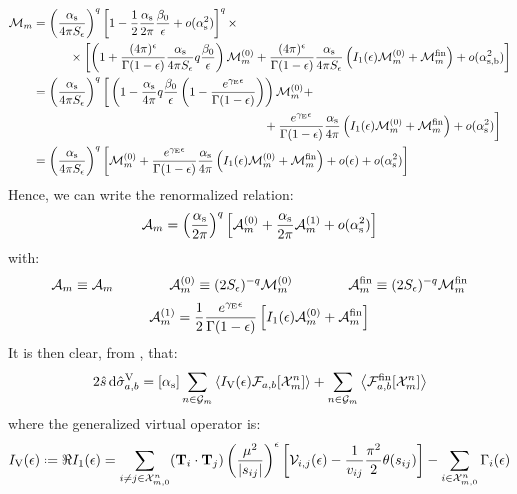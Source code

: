 \begin{equation*}
  \begin{split}
    \mathcal{M}_m
    & = \left( \frac{\alpha_\text{s}}{4\pi S_\epsilon} \right)^q \left[ 1 - \frac{1}{2} \frac{\alpha_\text{s}}{2\pi} \frac{\beta_0}{\epsilon} + o(\alpha_\text{s}^2) \right]^q \times \\
    & \qquad \quad \times \left[ \left( 1 + \frac{(4\pi)^\epsilon}{\Gamma(1-\epsilon)} \frac{\alpha_\text{s}}{4\pi S_\epsilon} q \frac{\beta_0}{\epsilon} \right) \mathcal{M}_m^{(0)} + \frac{(4\pi)^\epsilon}{\Gamma(1-\epsilon)} \frac{\alpha_\text{s}}{4\pi S_\epsilon} \left( I_1(\epsilon) \mathcal{M}_m^{(0)} + \mathcal{M}_m^\text{fin} \right) + o(\alpha_\text{s,b}^2) \right] \\
    & = \left( \frac{\alpha_\text{s}}{4\pi S_\epsilon} \right)^q \bigg[ \left( 1 - \frac{\alpha_\text{s}}{4\pi} q \frac{\beta_0}{\epsilon} \left( 1 - \frac{e^{\gamma_\text{E}\epsilon}}{\Gamma(1-\epsilon)} \right) \right) \mathcal{M}_m^{(0)} + \\
    & \qquad \qquad \qquad \qquad \qquad \qquad \qquad \qquad \qquad \quad + \frac{e^{\gamma_\text{E}\epsilon}}{\Gamma(1-\epsilon)} \frac{\alpha_\text{s}}{4\pi} \left( I_1(\epsilon) \mathcal{M}_m^{(0)} + \mathcal{M}_m^\text{fin} \right) + o(\alpha_\text{s}^2) \bigg] \\
    & = \left( \frac{\alpha_\text{s}}{4\pi S_\epsilon} \right)^q \left[ \mathcal{M}_m^{(0)} + \frac{e^{\gamma_\text{E}\epsilon}}{\Gamma(1-\epsilon)} \frac{\alpha_\text{s}}{4\pi} \left( I_1(\epsilon) \mathcal{M}_m^{(0)} + \mathcal{M}_m^\text{fin} \right) + o(\epsilon) + o(\alpha_\text{s}^2) \right]
  \end{split}
\end{equation*}
Hence, we can write the renormalized relation:
\begin{equation}
  \mathcal{A}_m = \left( \frac{\alpha_\text{s}}{2\pi} \right)^q \left[ \mathcal{A}_m^{(0)} + \frac{\alpha_\text{s}}{2\pi} \mathcal{A}_m^{(1)} + o(\alpha_\text{s}^2) \right]
\end{equation}
with:
\begin{equation}
  \mathcal{A}_m \equiv \mathcal{A}_m
  \qquad \qquad
  \mathcal{A}_m^{(0)} \equiv (2S_\epsilon)^{-q} \mathcal{M}_m^{(0)}
  \qquad \qquad
  \mathcal{A}_m^\text{fin} \equiv (2S_\epsilon)^{-q} \mathcal{M}_m^\text{fin}
\end{equation}
\begin{equation}
  \mathcal{A}_m^{(1)} = \frac{1}{2} \frac{e^{\gamma_\text{E}\epsilon}}{\Gamma(1-\epsilon)} \left[ I_1(\epsilon) \mathcal{A}_m^{(0)} + \mathcal{A}_m^\text{fin} \right]
\end{equation}
It is then clear, from , that:
\begin{equation}
  2\hat{s}\, \mathrm{d}\hat{\sigma}_{a,b}^\text{V} = [\alpha_\text{s}] \sum_{n \in \mathcal{G}_m} \left\langle I_\text{V}(\epsilon) \mathcal{F}_{a,b}[\mathcal{X}^{n}_{m}] \right\rangle + \sum_{n \in \mathcal{G}_m} \left\langle \mathcal{F}_{a,b}^\text{fin}[\mathcal{X}^{n}_{m}] \right\rangle
\end{equation}
where the generalized virtual operator is:
\begin{equation}
  \ivo(\de) \defeq \Re \ioo(\de) = \sum_{i \neq j \in \fsp{n}{m}} (\cc) \left( \frac{\mu^2}{\abs{s_{ij}}} \right)^\de \left[ \ns_{i,j}(\de) - \frac{1}{v_{ij}} \frac{\pi^2}{2} \theta(s_{ij}) \right] - \sum_{i \in \fsp{n}{m}} \Gamma_i(\de)
\end{equation}

